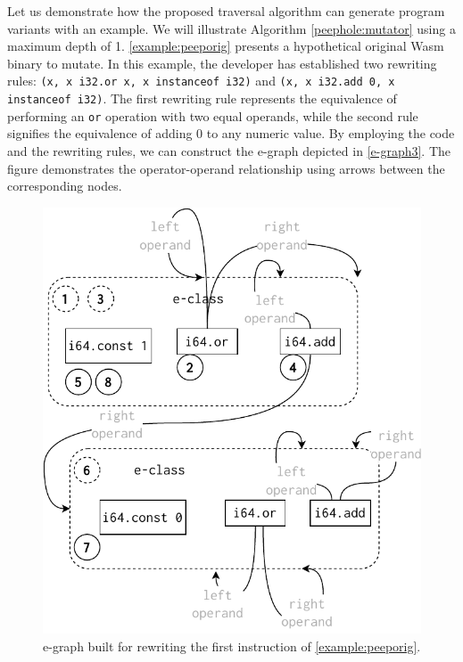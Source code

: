 
Let us demonstrate how the proposed traversal algorithm can generate program variants with an example. 
We will illustrate Algorithm \ref{peephole:mutator} using a maximum depth of 1. 
\autoref{example:peeporig} presents a hypothetical original Wasm binary to mutate. 
In this example, the developer has established two rewriting rules: \texttt{(x, x i32.or x, x instanceof i32)} and \texttt{(x, x i32.add 0, x instanceof i32)}. The first rewriting rule represents the equivalence of performing an \texttt{or} operation with two equal operands, while the second rule signifies the equivalence of adding 0 to any numeric value.
By employing the code and the rewriting rules, we can construct the e-graph depicted in \autoref{e-graph3}. The figure demonstrates the operator-operand relationship using arrows between the corresponding nodes.




\begin{figure}
    \centering
    \includegraphics[width=0.75\linewidth]{figures/egraph3.pdf}
    \caption{e-graph built for rewriting the first instruction of \autoref{example:peeporig}. }
  \label{e-graph3}
\end{figure}



